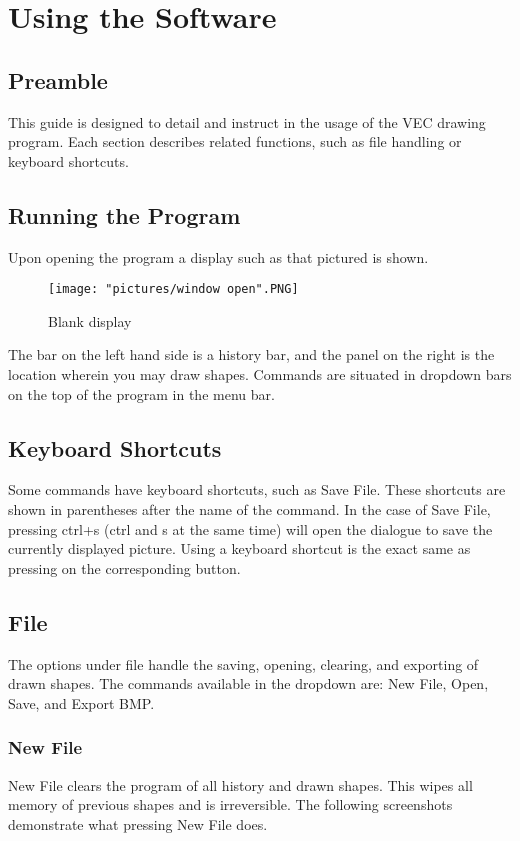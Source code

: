 \documentclass[12pt]{article} %
\begin{document}
\newpage

\section{Using the Software}

\subsection{Preamble}
This guide is designed to detail and instruct in the usage of the VEC drawing program. Each section describes related functions, such as file handling or keyboard shortcuts.

\subsection{Running the Program}
Upon opening the program a display such as that pictured is shown. 

\begin{figure}[hbtp]
\caption{Blank display}
\centering
\texttt{[image: "pictures/window open".PNG]}
\end{figure}


The bar on the left hand side is a history bar, and the panel on the right is the location wherein you may draw shapes. Commands are situated in dropdown bars on the top of the program in the menu bar. 

\subsection{Keyboard Shortcuts}
Some commands have keyboard shortcuts, such as Save File. These shortcuts are shown in parentheses after the name of the command. In the case of Save File, pressing ctrl+s (ctrl and s at the same time) will open the dialogue to save the currently displayed picture. Using a keyboard shortcut is the exact same as pressing on the corresponding button.

\subsection{File}
The options under file handle the saving, opening, clearing, and exporting of drawn shapes. The commands available in the dropdown are: New File, Open, Save, and Export BMP.

\subsubsection{New File}
New File clears the program of all history and drawn shapes. This wipes all memory of previous shapes and is irreversible. The following screenshots demonstrate what pressing New File does.
\end{document}
